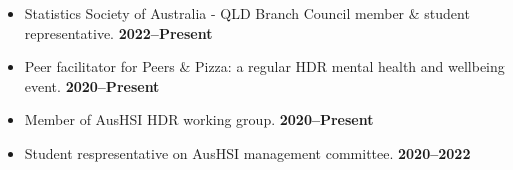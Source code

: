 \begin{itemize}
	\item Statistics Society of Australia - QLD Branch Council member \& student representative. \hfill\textbf{2022--Present}
	\item Peer facilitator for Peers \& Pizza: a regular HDR mental health and wellbeing event. \hfill\textbf{2020--Present}
	\item Member of AusHSI HDR working group. \hfill\textbf{2020--Present}
	\item Student respresentative on AusHSI management committee. \hfill\textbf{2020--2022}
\end{itemize}\par